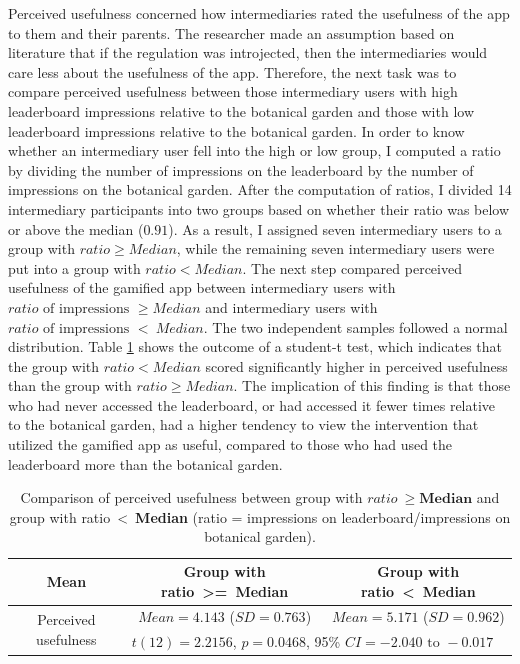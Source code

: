 Perceived usefulness concerned how intermediaries rated the usefulness of the app to them and their parents. The researcher made an assumption based on literature that if the regulation was introjected, then the intermediaries would care less about the usefulness of the app. Therefore, the next task was to compare perceived usefulness between those intermediary users with high leaderboard impressions relative to the botanical garden and those with low leaderboard impressions relative to the botanical garden. In order to know whether an intermediary user fell into the high or low group, I computed a ratio by dividing the number of impressions on the leaderboard by the number of impressions on the botanical garden. After the computation of ratios, I divided 14 intermediary participants into two groups based on whether their ratio was below or above the median ($0.91$). As a result, I assigned seven intermediary users to a group with $ratio\geq Median$, while the remaining seven intermediary users were put into a group with $ratio<Median$. The next step compared perceived usefulness of the gamified app between intermediary users with $ratio \text{ of impressions }\geq Median$ and intermediary users with $ratio \text{ of  impressions }<~Median$. The two independent samples followed a normal distribution. Table \ref{table:pu_leaderboard_bias} shows the outcome  of a student-t test, which indicates that the group with $ratio<Median$ scored significantly higher in perceived usefulness than the group with $ratio\geq Median$. The implication of this finding is that those who had never accessed the leaderboard, or had accessed it fewer times relative to the botanical garden, had a higher tendency to view the intervention that utilized the gamified app as useful, compared to those who had used the leaderboard more than the botanical garden. 

\begin{table}[h!]
  \begin{center}
    \caption{Comparison of perceived usefulness between group with $ratio~\geq\textbf{Median}$ and group with ratio~\textless~\textbf{Median} (ratio = impressions on leaderboard/impressions on botanical garden).}
    \label{table:pu_leaderboard_bias}
	\begin{tabular}{|c|c|c|}
		\hline
		Mean &Group with ratio~\textgreater=~\textbf{Median}&Group with ratio~\textless~\textbf{Median}\\
		\hline
		 \multirow{2}{*}{Perceived usefulness}&$Mean=4.143$ ($SD = 0.763$)&$Mean=5.171$ ($SD = 0.962$)\\\cline{2-3} 

		 &\multicolumn{2}{|l|}{$t(12)=2.2156$, $p=0.0468$, 95\% $CI = -2.040 \text{ to }  -0.017$} \\
\hline
	\end{tabular}
  \end{center}
\end{table}

